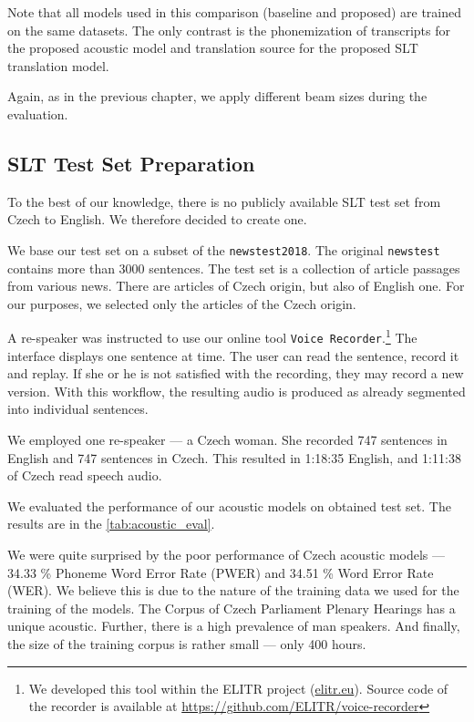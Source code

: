 Note that all models used in this comparison (baseline and proposed) are trained on the same datasets. The only contrast is the phonemization of transcripts for the proposed acoustic model and translation source for the proposed SLT translation model.

Again, as in the previous chapter, we apply different beam sizes during the evaluation.

\subsection{SLT Test Set Preparation}
\label{read-newstest}
To the best of our knowledge, there is no publicly available SLT test set from Czech to English. We therefore decided to create one.

We base our test set on a subset of the \texttt{newstest2018}. The original \texttt{news\-test} contains more than 3000 sentences. The test set is a collection of article passages from various news. There are articles of Czech origin, but also of English one. For our purposes, we selected only the articles of the Czech origin. 

A re-speaker was instructed to use our online tool \texttt{Voice Recorder}.\footnote{We developed this tool within the ELITR project (\url{elitr.eu}). Source code of the recorder is available at \url{https://github.com/ELITR/voice-recorder}} The interface displays one sentence at time. The user can read the sentence, record it and replay. If she or he is not satisfied with the recording, they may record a new version. With this workflow, the resulting audio is produced as already segmented into individual sentences.

We employed one re-speaker --- a Czech woman. She recorded 747 sentences in English and 747 sentences in Czech. This resulted in 1:18:35 English, and 1:11:38 of Czech read speech audio.

We evaluated the performance of our acoustic models on obtained test set. The results are in the \cref{tab:acoustic_eval}. 

We were quite surprised by the poor performance of Czech acoustic models --- 34.33 \% Phoneme Word Error Rate (PWER) and 34.51 \% Word Error Rate (WER). We believe this is due to the nature of the training data we used for the training of the models. The Corpus of Czech Parliament Plenary Hearings has a unique acoustic. Further, there is a high prevalence of man speakers. And finally, the size of the training corpus is rather small --- only 400 hours.

